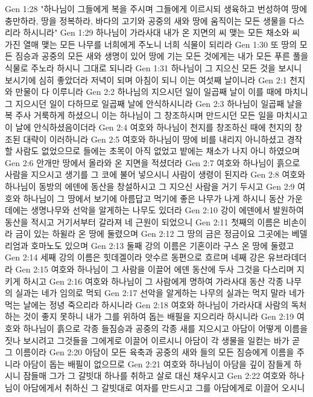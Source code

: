 Gen 1:28  "하나님이 그들에게 복을 주시며 그들에게 이르시되 생육하고 번성하여 땅에 충만하라, 땅을 정복하라, 바다의 고기와 공중의 새와 땅에 움직이는 모든 생물을 다스리라 하시니라"
Gen 1:29  하나님이 가라사대 내가 온 지면의 씨 맺는 모든 채소와 씨 가진 열매 맺는 모든 나무를 너희에게 주노니 너희 식물이 되리라
Gen 1:30  또 땅의 모든 짐승과 공중의 모든 새와 생명이 있어 땅에 기는 모든 것에게는 내가 모든 푸른 풀을 식물로 주노라 하시니 그대로 되니라
Gen 1:31  하나님이 그 지으신 모든 것을 보시니 보시기에 심히 좋았더라 저녁이 되며 아침이 되니 이는 여섯째 날이니라
Gen 2:1  천지와 만물이 다 이루니라
Gen 2:2  하나님의 지으시던 일이 일곱째 날이 이를 때에 마치니 그 지으시던 일이 다하므로 일곱째 날에 안식하시니라
Gen 2:3  하나님이 일곱째 날을 복 주사 거룩하게 하셨으니 이는 하나님이 그 창조하시며 만드시던 모든 일을 마치시고 이 날에 안식하셨음이더라
Gen 2:4  여호와 하나님이 천지를 창조하신 때에 천지의 창조된 대략이 이러하니라
Gen 2:5  여호와 하나님이 땅에 비를 내리지 아니하셨고 경작할 사람도 없었으므로 들에는 초목이 아직 없었고 밭에는 채소가 나지 아니 하였으며
Gen 2:6  안개만 땅에서 올라와 온 지면을 적셨더라
Gen 2:7  여호와 하나님이 흙으로 사람을 지으시고 생기를 그 코에 불어 넣으시니 사람이 생령이 된지라
Gen 2:8  여호와 하나님이 동방의 에덴에 동산을 창설하시고 그 지으신 사람을 거기 두시고
Gen 2:9  여호와 하나님이 그 땅에서 보기에 아름답고 먹기에 좋은 나무가 나게 하시니 동산 가운데에는 생명나무와 선악을 알게하는 나무도 있더라
Gen 2:10  강이 에덴에서 발원하여 동산을 적시고 거기서부터 갈라져 네 근원이 되었으니
Gen 2:11  첫째의 이름은 비손이라 금이 있는 하윌라 온 땅에 둘렸으며
Gen 2:12  그 땅의 금은 정금이요 그곳에는 베델리엄과 호마노도 있으며
Gen 2:13  둘째 강의 이름은 기혼이라 구스 온 땅에 둘렸고
Gen 2:14  세째 강의 이름은 힛데겔이라 앗수르 동편으로 흐르며 네째 강은 유브라데더라
Gen 2:15  여호와 하나님이 그 사람을 이끌어 에덴 동산에 두사 그것을 다스리며 지키게 하시고
Gen 2:16  여호와 하나님이 그 사람에게 명하여 가라사대 동산 각종 나무의 실과는 네가 임의로 먹되
Gen 2:17  선악을 알게하는 나무의 실과는 먹지 말라 네가 먹는 날에는 정녕 죽으리라 하시니라
Gen 2:18  여호와 하나님이 가라사대 사람의 독처하는 것이 좋지 못하니 내가 그를 위하여 돕는 배필을 지으리라 하시니라
Gen 2:19  여호와 하나님이 흙으로 각종 들짐승과 공중의 각종 새를 지으시고 아담이 어떻게 이름을 짓나 보시려고 그것들을 그에게로 이끌어 이르시니 아담이 각 생물을 일컫는 바가 곧 그 이름이라
Gen 2:20  아담이 모든 육축과 공중의 새와 들의 모든 짐승에게 이름을 주니라 아담이 돕는 배필이 없으므로
Gen 2:21  여호와 하나님이 아담을 깊이 잠들게 하시니 잠들매 그가 그 갈빗대 하나를 취하고 살로 대신 채우시고
Gen 2:22  여호와 하나님이 아담에게서 취하신 그 갈빗대로 여자를 만드시고 그를 아담에게로 이끌어 오시니
